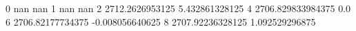 0 nan nan
1 nan nan
2 2712.2626953125 5.432861328125
4 2706.829833984375 0.0
6 2706.82177734375 -0.008056640625
8 2707.92236328125 1.092529296875
